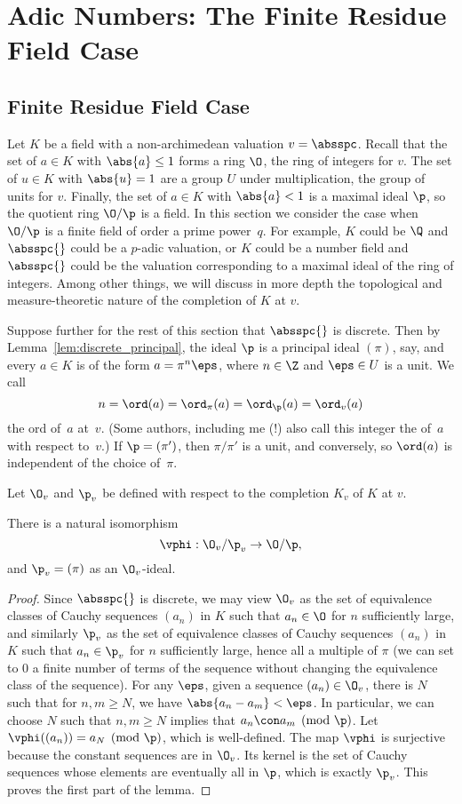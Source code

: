 \chapter{Adic Numbers: The Finite Residue Field Case}

\section{Finite Residue Field Case}
Let $K$ be a field with a non-archimedean valuation $v=\absspc$.
Recall that the set of $a\in K$ with $\abs{a}\leq 1$ forms a ring
$\O$, the ring of integers for $v$.  The set of $u\in K$ with
$\abs{u}=1$ are a group $U$ under multiplication, the group of units
for $v$.  Finally, the set of $a\in K$ with $\abs{a}<1$ is a maximal
ideal $\p$, so the quotient ring $\O/\p$ is a field.  In this section
we consider the case when $\O/\p$ is a finite field of order a prime
power~$q$.  For example, $K$ could be $\Q$ and $\absspc{}$ could be a
$p$-adic valuation, or $K$ could be a number field and $\absspc{}$
could be the valuation corresponding to a maximal ideal of the ring of
integers.  Among other things, we will discuss in more depth the
topological and measure-theoretic nature of the completion of $K$ at
$v$.

Suppose further for the rest of this section that $\absspc{}$ is
discrete.  Then by Lemma~\ref{lem:discrete_principal}, the ideal $\p$
is a principal ideal $(\pi)$, say, and every $a\in K$ is of the form
$a=\pi^n\eps$, where $n\in\Z$ and $\eps\in U$ is a unit. We call
$$
n = \ord(a) = \ord_\pi(a) = \ord_\p(a) = \ord_v(a)
$$
the ord of~$a$ at~$v$.  (Some authors, including me (!) also call
this integer the  of~$a$ with respect to~$v$.)  If
$\p=(\pi')$, then $\pi/\pi'$ is a unit, and conversely, so $\ord(a)$
is independent of the choice of~$\pi$.

Let $\O_v$ and $\p_v$ be defined with respect to the completion $K_v$
of $K$ at $v$.  
\begin{lemma}
There is a natural isomorphism 
$$
\vphi:\O_v/\p_v \to \O/\p,
$$
and $\p_v = (\pi)$ as an $\O_v$-ideal.
\end{lemma}
\begin{proof}
  Since $\absspc{}$ is discrete, we may view $\O_v$ as the set of equivalence classes of Cauchy
  sequences $(a_n)$ in $K$ such that $a_n\in \O$ for $n$ sufficiently
  large, and similarly $\p_v$ as the set of equivalence classes of Cauchy sequences $(a_n)$ in $K$ such that $a_n \in \p_v$ for $n$ sufficiently large, hence all a multiple of $\pi$ (we can set to $0$
  a finite number of terms of the sequence without changing the
  equivalence class of the sequence). For any $\eps$, given a sequence $(a_n) \in \O_v$, there is $N$
  such that for $n,m\geq N$, we have $\abs{a_n-a_m}<\eps$.  In
  particular, we can choose $N$ such that $n,m\geq N$ implies that
  $a_n\con a_m\pmod{\p}$.  Let $\vphi((a_n)) = a_N\pmod{\p}$, which is
  well-defined.  The map $\vphi$ is surjective because the constant
  sequences are in $\O_v$.  Its kernel is the set of Cauchy sequences
  whose elements are eventually all in $\p$, which is exactly $\p_v$.
  This proves the first part of the lemma.  
\end{proof}

